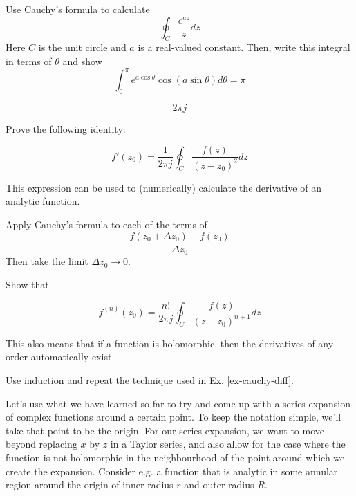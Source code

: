 \begin{exer}
Use Cauchy's formula to calculate 
$$\oint_{{C}}  \frac {e^{az}} {z} dz$$
Here ${C}$ is the unit circle and $a$ is a real-valued constant. Then, write this integral in terms of $\theta$ and show
$$ \int_0^\pi e ^{a \cos \theta} \cos (a \sin \theta) d\theta = \pi $$
\begin{sol}
$$2 \pi j$$
\end{sol}
\end{exer}

\begin{exer}
\label{ex-cauchy-diff}
Prove the following identity:

$$f'(z_0)=\frac{1}{2 \pi j} \oint_{{C}} \frac{f(z)} {(z-z_0)^2} dz$$

This expression can be used to (numerically) calculate the derivative of an analytic function.
\begin{hnt}
Apply Cauchy's formula to each of the terms of $$\frac{f(z_0+\Delta z_0) - f(z_0)}{\Delta z_0}$$ Then take the limit ${\Delta z_0} \to 0$.
\end{hnt}
\end{exer}

\begin{exer}
Show that

  $$f^{(n)}(z_0)=\frac{n!}{2 \pi j} \oint_{{C}} \frac{f(z)} {(z-z_0)^{n+1}} dz$$
  
This also means that if a function is holomorphic, then the derivatives of any order automatically exist.
\begin{hnt}
Use induction and repeat the technique used in Ex. \ref{ex-cauchy-diff}.
\end{hnt}  
\end{exer}


\pagebreak




Let's use what we have learned so far to try and come up with a series expansion of complex functions around a certain point. To keep the notation simple, we’ll take that point to be the origin. For our series expansion, we want to move beyond replacing $x$ by $z$ in a Taylor series, and also allow for the case where the function is not holomorphic in the neighbourhood of the point around which we create the expansion. Consider e.g. a function that is analytic in some annular region around the origin of inner radius $r$ and outer radius $R$.

